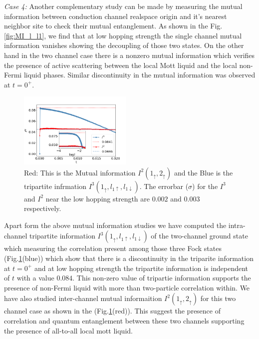 \documentclass[reprint,prb,superscriptaddress]{revtex4-1}
\begin{document}
\par \textit{Case 4:} Another complementary study can be made by measuring the mutual information between conduction channel realspace origin and it's nearest neighbor site to check their mutual entanglement. As shown in the Fig.\ref{fig:MI_l_l1}, we find that at low hopping strength the single channel mutual information vanishes showing the decoupling of those two states. On the other hand in the two channel case there is a nonzero mutual information which verifies the presence of active scattering between the local Mott liquid and the local non-Fermi liquid phases. Similar discontinuity in the mutual information was observed at $t=0^+$.
\begin{figure}[!h]
\centering
\includegraphics[width=0.48\textwidth]{plt/I3_I2_A_I.png}
\caption{Red: This is the Mutual information $I^2(1_{\uparrow},2_{\uparrow})$ and the Blue is the tripartite infrmation $I^3(1_{\uparrow},l_{1\uparrow},l_{1\downarrow})$. The errorbar ($\sigma$) for the $I^3$ and $I^2$ near the low hopping strength are $0.002$ and $0.003$ respectively.}
\label{fig:I3_I2_two_channel}
\end{figure}
Apart form the above mutual information studies we have computed the intra-channel tripartite information $I^3(1_{\uparrow},l_{1\uparrow},l_{1\downarrow})$ of the two-channel ground state which measuring the correlation present among those three Fock states (Fig.\ref{fig:I3_I2_two_channel}(blue)) which show that there is a discontinuity in the triparite information at $t=0^+$ and at low hopping strength the tripartite information is independent of $t$ with a value $0.084$. This non-zero value of tripartie information supports the presence of non-Fermi liquid with more than two-particle correlation within. We have also studied inter-channel mutual informaition $I^2(1_{\uparrow},2_{\uparrow})$ for this two channel case as shown in the (Fig.\ref{fig:I3_I2_two_channel}(red)). This suggest the presence of correlation and quantum entanglement between these two channels supporting the presence of all-to-all local mott liquid.
\end{document}
